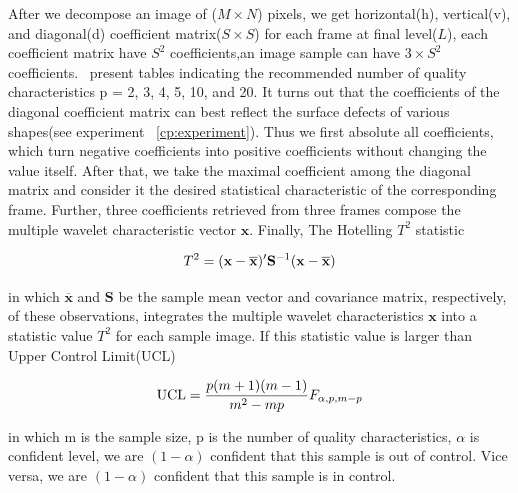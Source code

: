 After we decompose an image of ($M \times N$) pixels, we get horizontal(h), vertical(v), and diagonal(d) coefficient matrix($S \times S$) for each frame at final level($L$), each coefficient matrix have $S^2$ coefficients,an image sample can have $3 \times S^2$ coefficients.~\cite{montgomery2020introduction} present tables indicating the recommended number of quality characteristics p = 2, 3, 4, 5, 10, and 20. It turns out that the coefficients of the diagonal coefficient matrix can best reflect the surface defects of various shapes(see experiment ~\ref{cp:experiment}). Thus we first absolute all coefficients, which turn negative coefficients into positive coefficients without changing the value itself. After that, we take the maximal coefficient among the diagonal matrix and consider it the desired statistical characteristic of the corresponding frame. Further, three coefficients retrieved from three frames compose the multiple wavelet characteristic vector $\mathbf{x}$. Finally, The Hotelling $T^{2}$ statistic

\begin{equation}
\centering T^{2}=(\mathbf{x}-\overline{\mathbf{x}})^{\prime} \mathbf{S}^{-1}(\mathbf{x}-\overline{\mathbf{x}}) \label{equa:T2}
\end{equation}

in which $\overline{\mathbf{x}}$ and $\mathbf{S}$ be the sample mean vector and
covariance matrix, respectively, of these observations,
integrates the multiple wavelet characteristics $\mathbf{x}$ into a statistic value $T^{2}$ for each sample image.
If this statistic value is larger than Upper Control Limit(UCL)

\begin{equation}
\centering \mathrm{UCL}=\frac{p(m+1)(m-1)}{m^{2}-m p} F_{\alpha, p, m-p}
\label{equa:UCL}
\end{equation}

in which m is the sample size, p is the number of quality characteristics, $\alpha$ is confident level,
we are $(1 - \alpha)$ confident that this sample is out of control. Vice versa, we are $(1- \alpha)$ confident that this sample is in control.



